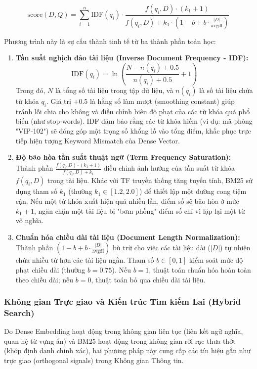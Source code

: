 \begin{equation}
    \text{score}(D, Q) = \sum_{i=1}^{n} \text{IDF}(q_i) \cdot \frac{f(q_i, D) \cdot (k_1 + 1)}{f(q_i, D) + k_1 \cdot \left(1 - b + b \cdot \frac{|D|}{\text{avgdl}}\right)}
\end{equation}

Phương trình này là sự cấu thành tinh tế từ ba thành phần toán học:
\begin{enumerate}
    \item \textbf{Tần suất nghịch đảo tài liệu (Inverse Document Frequency - IDF):}
    \begin{equation}
        \text{IDF}(q_i) = \ln \left( \frac{N - n(q_i) + 0.5}{n(q_i) + 0.5} + 1 \right)
    \end{equation}
    Trong đó, $N$ là tổng số tài liệu trong tập dữ liệu, và $n(q_i)$ là số tài liệu chứa từ khóa $q_i$. Giá trị $+0.5$ là hằng số làm mượt (smoothing constant) giúp tránh lỗi chia cho không và điều chỉnh biên độ phạt của các từ khóa quá phổ biến (như stop-words). IDF đảm bảo rằng các từ khóa hiếm (ví dụ: mã phòng "VIP-102") sẽ đóng góp một trọng số khổng lồ vào tổng điểm, khắc phục trực tiếp hiện tượng Keyword Mismatch của Dense Vector.

    \item \textbf{Độ bão hòa tần suất thuật ngữ (Term Frequency Saturation):} 
    Thành phần $\frac{f(q_i, D) \cdot (k_1 + 1)}{f(q_i, D) + k_1}$ điều chỉnh ảnh hưởng của tần suất từ khóa $f(q_i, D)$ trong tài liệu. Khác với TF truyền thống tăng tuyến tính, BM25 sử dụng tham số $k_1$ (thường $k_1 \in [1.2, 2.0]$) để thiết lập một đường cong tiệm cận. Nếu một từ khóa xuất hiện quá nhiều lần, điểm số sẽ bão hòa ở mức $k_1 + 1$, ngăn chặn một tài liệu bị "bơm phồng" điểm số chỉ vì lặp lại một từ vô nghĩa.

    \item \textbf{Chuẩn hóa chiều dài tài liệu (Document Length Normalization):}
    Thành phần $\left(1 - b + b \cdot \frac{|D|}{\text{avgdl}}\right)$ bù trừ cho việc các tài liệu dài ($|D|$) tự nhiên chứa nhiều từ hơn các tài liệu ngắn. Tham số $b \in [0, 1]$ kiểm soát mức độ phạt chiều dài (thường $b = 0.75$). Nếu $b=1$, thuật toán chuẩn hóa hoàn toàn theo chiều dài; nếu $b=0$, thuật toán bỏ qua chiều dài tài liệu.
\end{enumerate}

\subsubsection{Không gian Trực giao và Kiến trúc Tìm kiếm Lai (Hybrid Search)}
Do Dense Embedding hoạt động trong không gian liên tục (liên kết ngữ nghĩa, quan hệ từ vựng ẩn) và BM25 hoạt động trong không gian rời rạc thưa thớt (khớp định danh chính xác), hai phương pháp này cung cấp các tín hiệu gần như trực giao (orthogonal signals) trong Không gian Thông tin. 

